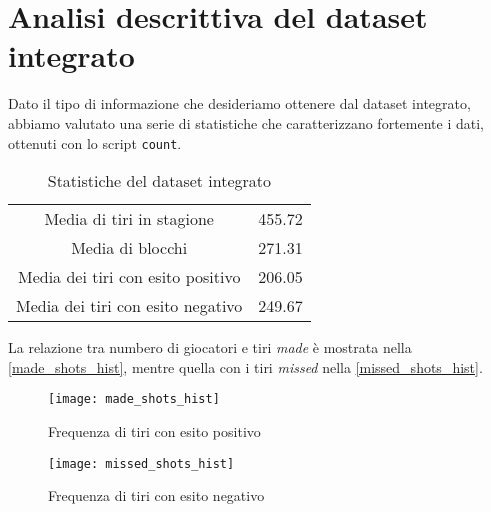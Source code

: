 \pagebreak
\section{Analisi descrittiva del dataset integrato}

Dato il tipo di informazione che desideriamo ottenere dal dataset integrato, abbiamo valutato una serie di statistiche che caratterizzano fortemente i dati, ottenuti con lo script \texttt{count}.

\begin{table}[h!]
\centering
	\begin{tabular}{c c} 
	 
		Media di tiri in stagione& 455.72 \\
		Media di blocchi& 271.31 \\
		Media dei tiri con esito positivo& 206.05\\
		Media dei tiri con esito negativo& 249.67\\
		\end{tabular}
		\caption{Statistiche del dataset integrato}
\end{table}

La relazione tra numbero di giocatori e tiri \textit{made} è mostrata nella \autoref{made_shots_hist}, mentre quella con i tiri \textit{missed} nella \autoref{missed_shots_hist}.

\begin{figure}
\caption{Frequenza di tiri con esito positivo}
\label{made_shots_hist}
\texttt{[image: made\_shots\_hist]}
\end{figure}

\begin{figure}
\caption{Frequenza di tiri con esito negativo}
\label{missed_shots_hist}
\texttt{[image: missed\_shots\_hist]}
\end{figure}
